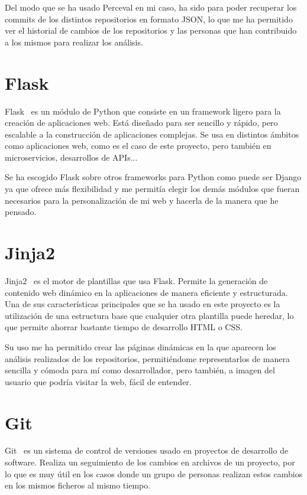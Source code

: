 \documentclass[a4paper, 12pt]{book}
\begin{document}
Del modo que se ha usado Perceval en mi caso, ha sido para poder recuperar los commits de los distintos repositorios en formato JSON, lo que me ha permitido ver el historial de cambios de los repositorios y las personas que han contribuido a los mismos para realizar los análisis.
\section{Flask}
\label{sec:Flask}

Flask~\cite{flask:_flask} es un módulo de Python que consiste en un framework ligero para la creación de aplicaciones web. Está diseñado para ser sencillo y rápido, pero escalable a la construcción de aplicaciones complejas. Se usa en distintos ámbitos como aplicaciones web, como es el caso de este proyecto, pero también en microservicios, desarrollos de APIs...

Se ha escogido Flask sobre otros frameworks para Python como puede ser Django ya que ofrece más flexibilidad y me permitía elegir los demás módulos que fueran necesarios para la personalización de mi web y hacerla de la manera que he pensado.

\section{Jinja2}
\label{sec:Jinja2}

Jinja2~\cite{jinja:_jinja} es el motor de plantillas que usa Flask. Permite la generación de contenido web dinámico en la aplicaciones de manera eficiente y estructurada. Una de sus características principales que se ha usado en este proyecto es la utilización de una estructura base que cualquier otra plantilla puede heredar, lo que permite ahorrar bastante tiempo de desarrollo HTML o CSS.

Su uso me ha permitido crear las páginas dinámicas en la que aparecen los análisis realizados de los repositorios, permitiéndome representarlos de manera sencilla y cómoda para mí como desarrollador, pero también, a imagen del usuario que podría visitar la web, fácil de entender.

\section{Git}
\label{sec:Git}

Git~\cite{git:_git}  es un sistema de control de versiones usado en proyectos de desarrollo de software. Realiza un seguimiento de los cambios en archivos de un proyecto, por lo que es muy útil en los casos donde un grupo de personas realizan estos cambios en los mismos ficheros al mismo tiempo.
\end{document}
